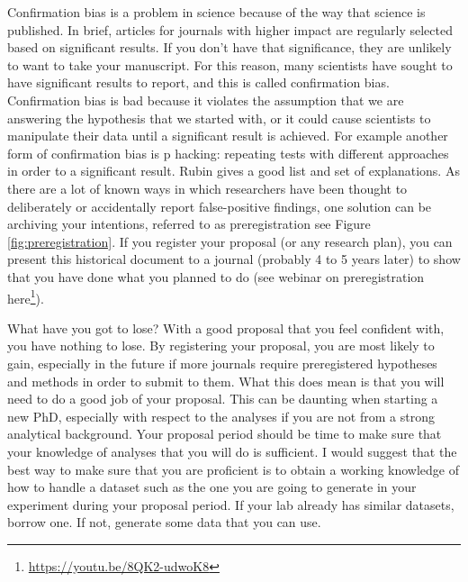 \documentclass[
]{krantz}
\renewcommand{\href}[2]{#2\footnote{\url{#1}}}
\begin{document}
Confirmation bias is a problem in science because of the way that science is published. In brief, articles for journals with higher impact are regularly selected based on significant results. If you don't have that significance, they are unlikely to want to take your manuscript. For this reason, many scientists have sought to have significant results to report, and this is called confirmation bias. Confirmation bias is bad because it violates the assumption that we are answering the hypothesis that we started with, or it could cause scientists to manipulate their data until a significant result is achieved. For example another form of confirmation bias is p hacking: repeating tests with different approaches in order to a significant result. Rubin \citeyearpar{rubin2020does} gives a good list and set of explanations. As there are a lot of known ways in which researchers have been thought to deliberately or accidentally report false-positive findings, one solution can be archiving your intentions, referred to as preregistration \citep{forstmeier2017detecting} see Figure \ref{fig:preregistration}. If you register your proposal (or any research plan), you can present this historical document to a journal (probably 4 to 5 years later) to show that you have done what you planned to do (see \href{https://youtu.be/8QK2-udwoK8}{webinar on preregistration here}).

What have you got to lose? With a good proposal that you feel confident with, you have nothing to lose. By registering your proposal, you are most likely to gain, especially in the future if more journals require preregistered hypotheses and methods in order to submit to them. What this does mean is that you will need to do a good job of your proposal. This can be daunting when starting a new PhD, especially with respect to the analyses if you are not from a strong analytical background. Your proposal period should be time to make sure that your knowledge of analyses that you will do is sufficient. I would suggest that the best way to make sure that you are proficient is to obtain a working knowledge of how to handle a dataset such as the one you are going to generate in your experiment during your proposal period. If your lab already has similar datasets, borrow one. If not, generate some data that you can use.
\end{document}
